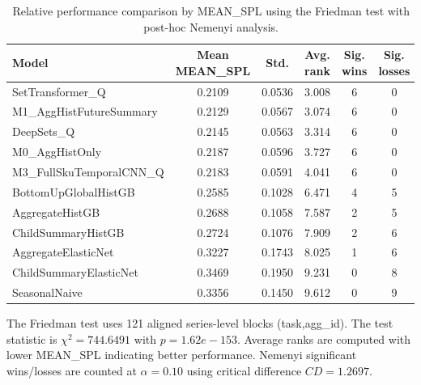 \begin{table}[H]
\centering
\caption{Relative performance comparison by MEAN_SPL using the Friedman test with post-hoc Nemenyi analysis.}
\label{tab:stats_mean_spl}
\begin{threeparttable}
\begin{tabular}{lccccc}
\toprule
Model & Mean MEAN_SPL & Std. & Avg. rank & Sig. wins & Sig. losses \\
\midrule
SetTransformer\_Q & 0.2109 & 0.0536 & 3.008 & 6 & 0 \\
M1\_AggHistFutureSummary & 0.2129 & 0.0567 & 3.074 & 6 & 0 \\
DeepSets\_Q & 0.2145 & 0.0563 & 3.314 & 6 & 0 \\
M0\_AggHistOnly & 0.2187 & 0.0596 & 3.727 & 6 & 0 \\
M3\_FullSkuTemporalCNN\_Q & 0.2183 & 0.0591 & 4.041 & 6 & 0 \\
BottomUpGlobalHistGB & 0.2585 & 0.1028 & 6.471 & 4 & 5 \\
AggregateHistGB & 0.2688 & 0.1058 & 7.587 & 2 & 5 \\
ChildSummaryHistGB & 0.2724 & 0.1076 & 7.909 & 2 & 6 \\
AggregateElasticNet & 0.3227 & 0.1743 & 8.025 & 1 & 6 \\
ChildSummaryElasticNet & 0.3469 & 0.1950 & 9.231 & 0 & 8 \\
SeasonalNaive & 0.3356 & 0.1450 & 9.612 & 0 & 9 \\
\bottomrule
\end{tabular}
\begin{tablenotes}
\footnotesize \item The Friedman test uses 121 aligned series-level blocks (task,agg\_id). The test statistic is $\chi^2=744.6491$ with $p=1.62e-153$. Average ranks are computed with lower MEAN_SPL indicating better performance. Nemenyi significant wins/losses are counted at $\alpha=0.10$ using critical difference $CD=1.2697$.
\end{tablenotes}
\end{threeparttable}
\end{table}
